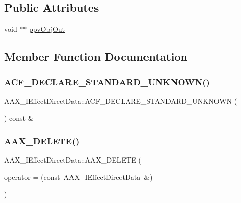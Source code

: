 \subsection*{Public Attributes}
\begin{DoxyCompactItemize}
\item 
void $\ast$$\ast$ \mbox{\hyperlink{a01817_a365297b233c5341a924e74d758dc2b5d}{ppv\+Obj\+Out}}
\end{DoxyCompactItemize}


\subsection{Member Function Documentation}
\mbox{\label{a01817_ae303da21b6ac9d50f0c797e49380bb80}} 
\subsubsection{\texorpdfstring{ACF\_DECLARE\_STANDARD\_UNKNOWN()}{ACF\_DECLARE\_STANDARD\_UNKNOWN()}}
{\footnotesize\ttfamily A\+A\+X\+\_\+\+I\+Effect\+Direct\+Data\+::\+A\+C\+F\+\_\+\+D\+E\+C\+L\+A\+R\+E\+\_\+\+S\+T\+A\+N\+D\+A\+R\+D\+\_\+\+U\+N\+K\+N\+O\+WN (\begin{DoxyParamCaption}{ }\end{DoxyParamCaption}) const \&}

\mbox{\label{a01817_a05ab4a47b091e970c80e40e047374fe5}} 
\subsubsection{\texorpdfstring{AAX\_DELETE()}{AAX\_DELETE()}}
{\footnotesize\ttfamily A\+A\+X\+\_\+\+I\+Effect\+Direct\+Data\+::\+A\+A\+X\+\_\+\+D\+E\+L\+E\+TE (\begin{DoxyParamCaption}\item[{\mbox{\hyperlink{a01817}{A\+A\+X\+\_\+\+I\+Effect\+Direct\+Data}} \&}]{operator = {\ttfamily (const~\mbox{\hyperlink{a01817}{A\+A\+X\+\_\+\+I\+Effect\+Direct\+Data}}~\&)} }\end{DoxyParamCaption})}



